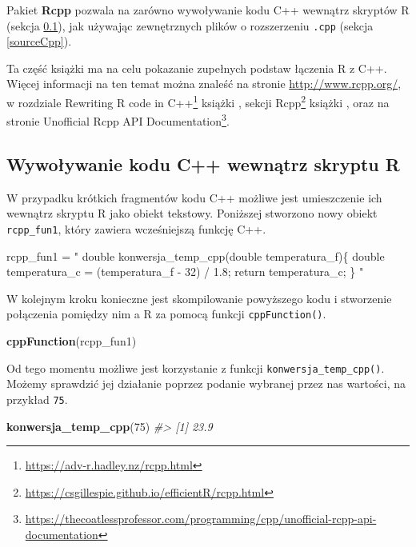 \documentclass[paper=6in:9in,pagesize=pdftex,headinclude=on,footinclude=on,10pt]{scrbook}
\newenvironment{Shaded}{\begin{snugshade}}{\end{snugshade}}
\newcommand{\CommentTok}[1]{\textcolor[rgb]{0.56,0.35,0.01}{\textit{#1}}}
\newcommand{\DecValTok}[1]{\textcolor[rgb]{0.00,0.00,0.81}{#1}}
\newcommand{\KeywordTok}[1]{\textcolor[rgb]{0.13,0.29,0.53}{\textbf{#1}}}
\newcommand{\NormalTok}[1]{#1}
\newcommand{\StringTok}[1]{\textcolor[rgb]{0.31,0.60,0.02}{#1}}
\DeclareRobustCommand{\href}[2]{#2\footnote{\url{#1}}}
\begin{document}
Pakiet \textbf{Rcpp} pozwala na zarówno wywoływanie kodu C++ wewnątrz skryptów R (sekcja \ref{cppFunction}), jak używając zewnętrznych plików o rozszerzeniu \texttt{.cpp} (sekcja \ref{sourceCpp}).

Ta część książki ma na celu pokazanie zupełnych podstaw łączenia R z C++.
Więcej informacji na ten temat można znaleść na stronie \url{http://www.rcpp.org/}, w \href{https://adv-r.hadley.nz/rcpp.html}{rozdziale Rewriting R code in C++} książki \citet{wickham2014advanced}, \href{https://csgillespie.github.io/efficientR/rcpp.html}{sekcji Rcpp} książki \citet{gillespie2016efficient}, oraz na stronie \href{https://thecoatlessprofessor.com/programming/cpp/unofficial-rcpp-api-documentation}{Unofficial Rcpp API Documentation}.

\hypertarget{cppFunction}{%
\subsection{Wywoływanie kodu C++ wewnątrz skryptu R}\label{cppFunction}}

W przypadku krótkich fragmentów kodu C++ możliwe jest umieszczenie ich wewnątrz skryptu R jako obiekt tekstowy.
Poniższej stworzono nowy obiekt \texttt{rcpp\_fun1}, który zawiera wcześniejszą funkcję C++.

\begin{Shaded}
\begin{Highlighting}[]
\NormalTok{rcpp_fun1 =}\StringTok{ "}
\StringTok{double konwersja_temp_cpp(double temperatura_f)\{}
\StringTok{  double temperatura_c = (temperatura_f - 32) / 1.8;}
\StringTok{  return temperatura_c;}
\StringTok{\}}
\StringTok{"}
\end{Highlighting}
\end{Shaded}

W kolejnym kroku konieczne jest skompilowanie powyższego kodu i stworzenie połączenia pomiędzy nim a R za pomocą funkcji \texttt{cppFunction()}.

\begin{Shaded}
\begin{Highlighting}[]
\KeywordTok{cppFunction}\NormalTok{(rcpp_fun1)}
\end{Highlighting}
\end{Shaded}

Od tego momentu możliwe jest korzystanie z funkcji \texttt{konwersja\_temp\_cpp()}.
Możemy sprawdzić jej działanie poprzez podanie wybranej przez nas wartości, na przykład \texttt{75}.

\begin{Shaded}
\begin{Highlighting}[]
\KeywordTok{konwersja_temp_cpp}\NormalTok{(}\DecValTok{75}\NormalTok{)}
\CommentTok{#> [1] 23.9}
\end{Highlighting}
\end{Shaded}
\end{document}

